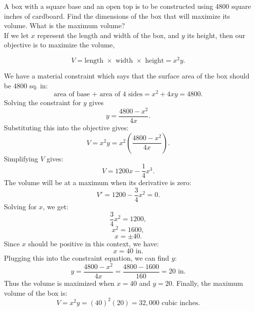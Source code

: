 \documentclass{ximera}
\begin{document}
\begin{example}[example 2]
A box with a square base and an open top is to be constructed using 4800 square inches of cardboard.  
Find the dimensions of the box that will maximize its volume.  What is the maximum volume?\\

If we let $x$ represent the length and width of the box, and $y$ its height, then our objective is to maximize 
the volume,


\begin{image}
\end{image}

\[V = \text{length $\times$ width $\times$ height} = x^2y.\]

We have a material constraint which says that the surface area of the box should be 4800 sq. in:
\[\text{area of base + area of 4 sides} = x^2 + 4xy = 4800.\]
Solving the constraint for $y$ gives
\[y = \frac{4800 - x^2}{4x}.\]
Substituting this into the objective gives:
\[V = x^2y = x^2 \left(\frac{4800 - x^2}{4x}\right).\]
Simplifying $V$ gives:
\[V = 1200x - \frac14 x^3.\]
The volume will be at a maximum when its derivative is zero:
\[V' = 1200 - \frac34 x^2 = 0.\]
Solving for $x$, we get:
\[ \frac34 x^2 = 1200, \]
\[x^2 = 1600,\]
\[x = \pm 40.\]
Since $x$ should be positive in this context, we have:
\[x = 40 \mbox{ in.}\]
Plugging this into the constraint equation, we can find $y$:
\[y = \frac{4800 - x^2}{4x} = \frac{4800 - 1600}{160} = 20 \mbox{ in.}\]
Thus the volume is maximized when $x = 40$ and $y = 20$. Finally, the maximum volume of the box is:
\[V = x^2y = (40)^2 (20) = 32{,}000 \mbox{ cubic inches}.\]

\end{example}


\begin{center}
\begin{foldable}
\end{foldable}
\end{center}
\end{document}
